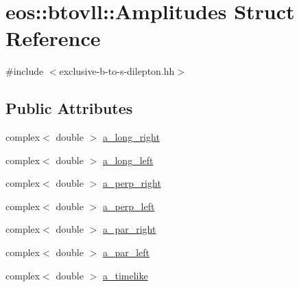 \hypertarget{structeos_1_1btovll_1_1Amplitudes}{
\section{eos::btovll::Amplitudes Struct Reference}
\label{structeos_1_1btovll_1_1Amplitudes}
}


{\ttfamily \#include $<$exclusive-\/b-\/to-\/s-\/dilepton.hh$>$}\subsection*{Public Attributes}
\begin{DoxyCompactItemize}
\item 
complex$<$ double $>$ \hyperlink{structeos_1_1btovll_1_1Amplitudes_a6b459929fb4284d7e947b837390dc07a}{a\_\-long\_\-right}
\item 
complex$<$ double $>$ \hyperlink{structeos_1_1btovll_1_1Amplitudes_a445006044e0547c19cece86890159ce7}{a\_\-long\_\-left}
\item 
complex$<$ double $>$ \hyperlink{structeos_1_1btovll_1_1Amplitudes_a0eb4cfaf2543cea66fa1307abb5737a0}{a\_\-perp\_\-right}
\item 
complex$<$ double $>$ \hyperlink{structeos_1_1btovll_1_1Amplitudes_a808710a7d0ed790976d1a5c9b960f6e5}{a\_\-perp\_\-left}
\item 
complex$<$ double $>$ \hyperlink{structeos_1_1btovll_1_1Amplitudes_aefccd00f09f49f4c3ae585d232786cfc}{a\_\-par\_\-right}
\item 
complex$<$ double $>$ \hyperlink{structeos_1_1btovll_1_1Amplitudes_a734ff0455a740eeb8d481c0b09c15b7b}{a\_\-par\_\-left}
\item 
complex$<$ double $>$ \hyperlink{structeos_1_1btovll_1_1Amplitudes_aba7c6fa6629f6bac6651bd74cdc884fb}{a\_\-timelike}
\end{DoxyCompactItemize}


